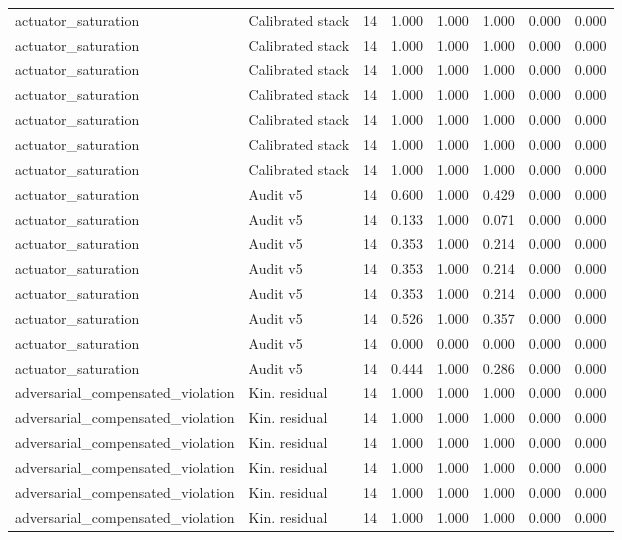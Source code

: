 {\begin{longtable}{llrrrrrr}
actuator\_saturation & Calibrated stack & 14 & 1.000 & 1.000 & 1.000 & 0.000 & 0.000 \\
actuator\_saturation & Calibrated stack & 14 & 1.000 & 1.000 & 1.000 & 0.000 & 0.000 \\
actuator\_saturation & Calibrated stack & 14 & 1.000 & 1.000 & 1.000 & 0.000 & 0.000 \\
actuator\_saturation & Calibrated stack & 14 & 1.000 & 1.000 & 1.000 & 0.000 & 0.000 \\
actuator\_saturation & Calibrated stack & 14 & 1.000 & 1.000 & 1.000 & 0.000 & 0.000 \\
actuator\_saturation & Calibrated stack & 14 & 1.000 & 1.000 & 1.000 & 0.000 & 0.000 \\
actuator\_saturation & Calibrated stack & 14 & 1.000 & 1.000 & 1.000 & 0.000 & 0.000 \\
actuator\_saturation & Audit v5 & 14 & 0.600 & 1.000 & 0.429 & 0.000 & 0.000 \\
actuator\_saturation & Audit v5 & 14 & 0.133 & 1.000 & 0.071 & 0.000 & 0.000 \\
actuator\_saturation & Audit v5 & 14 & 0.353 & 1.000 & 0.214 & 0.000 & 0.000 \\
actuator\_saturation & Audit v5 & 14 & 0.353 & 1.000 & 0.214 & 0.000 & 0.000 \\
actuator\_saturation & Audit v5 & 14 & 0.353 & 1.000 & 0.214 & 0.000 & 0.000 \\
actuator\_saturation & Audit v5 & 14 & 0.526 & 1.000 & 0.357 & 0.000 & 0.000 \\
actuator\_saturation & Audit v5 & 14 & 0.000 & 0.000 & 0.000 & 0.000 & 0.000 \\
actuator\_saturation & Audit v5 & 14 & 0.444 & 1.000 & 0.286 & 0.000 & 0.000 \\
adversarial\_compensated\_violation & Kin. residual & 14 & 1.000 & 1.000 & 1.000 & 0.000 & 0.000 \\
adversarial\_compensated\_violation & Kin. residual & 14 & 1.000 & 1.000 & 1.000 & 0.000 & 0.000 \\
adversarial\_compensated\_violation & Kin. residual & 14 & 1.000 & 1.000 & 1.000 & 0.000 & 0.000 \\
adversarial\_compensated\_violation & Kin. residual & 14 & 1.000 & 1.000 & 1.000 & 0.000 & 0.000 \\
adversarial\_compensated\_violation & Kin. residual & 14 & 1.000 & 1.000 & 1.000 & 0.000 & 0.000 \\
adversarial\_compensated\_violation & Kin. residual & 14 & 1.000 & 1.000 & 1.000 & 0.000 & 0.000 \\

\end{longtable}}
